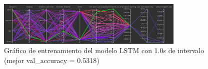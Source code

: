 \begin{figure}[H]
    \centering
    \includegraphics[width=0.8\textwidth]{Imagenes/Bitmap/tb-lstm-1.0.png}
    \caption{Gráfico de entrenamiento del modelo LSTM con 1.0s de intervalo (mejor val\_accuracy = 0.5318)}
    \label{fig:lstm-1.0-grafico}
\end{figure}